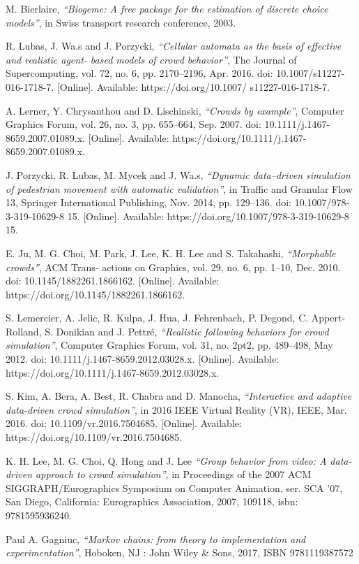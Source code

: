 \documentclass{standalone}
\begin{document}
\begin{thebibliography}{99}
M. Bierlaire,
  \textit{“Biogeme: A free package for the estimation of discrete choice models”}, 
in Swiss transport research conference, 
2003.

R. Lubas, J. Wa.s and J. Porzycki,
  \textit{“Cellular automata as the basis of effective and realistic agent- based models of crowd behavior”}, 
The Journal of Supercomputing, vol. 72, no. 6, pp. 2170–2196, 
Apr. 2016. 
doi: 10.1007/s11227-016-1718-7. 
[Online]. Available: https://doi.org/10.1007/ s11227-016-1718-7.

A. Lerner, Y. Chrysanthou and D. Lischinski, 
  \textit{“Crowds by example”}, 
  Computer Graphics Forum, vol. 26, no. 3, pp. 655–664, 
  Sep. 2007. 
  doi: 10.1111/j.1467-8659.2007.01089.x. 
  [Online]. Available: https://doi.org/10.1111/j.1467-8659.2007.01089.x.

J. Porzycki, R. Lubas, M. Mycek and J. Wa.s, 
  \textit{“Dynamic data–driven simulation of pedestrian movement with automatic validation”}, 
  in Traffic and Granular Flow 13, Springer International Publishing, 
  Nov. 2014, pp. 129–136. 
  doi: 10.1007/978-3-319-10629-8 15. 
  [Online]. Available: https://doi.org/10.1007/978-3-319-10629-8 15.

E. Ju, M. G. Choi, M. Park, J. Lee, K. H. Lee and S. Takahashi,
  \textit{“Morphable crowds”}, 
ACM Trans- actions on Graphics, vol. 29, no. 6, pp. 1–10, 
Dec. 2010. 
doi: 10.1145/1882261.1866162. 
[Online]. Available: https://doi.org/10.1145/1882261.1866162.

S. Lemercier, A. Jelic, R. Kulpa, J. Hua, J. Fehrenbach, P. Degond, C. Appert-Rolland, S. Donikian and J. Pettré,
  \textit{“Realistic following behaviors for crowd simulation”}, 
  Computer Graphics Forum, vol. 31, no. 2pt2, pp. 489–498, 
  May 2012. 
  doi: 10.1111/j.1467-8659.2012.03028.x. 
  [Online]. Available: https://doi.org/10.1111/j.1467-8659.2012.03028.x.

S. Kim, A. Bera, A. Best, R. Chabra and D. Manocha,
  \textit{“Interactive and adaptive data-driven crowd simulation”}, 
  in 2016 IEEE Virtual Reality (VR), IEEE, 
  Mar. 2016. 
  doi: 10.1109/vr.2016.7504685. 
  [Online]. Available: https://doi.org/10.1109/vr.2016.7504685.
 
K. H. Lee, M. G. Choi, Q. Hong and J. Lee
  \textit{“Group behavior from video: A data-driven approach to crowd simulation”}, 
in Proceedings of the 2007 ACM SIGGRAPH/Eurographics Symposium on Computer Animation, 
ser. SCA ’07, San Diego, California: Eurographics Association, 2007, 109118, 
isbn: 9781595936240.

Paul A. Gagniuc,
  \textit{“Markov chains: from theory to implementation and experimentation”}, 
Hoboken, NJ : John Wiley \& Sons, 
2017,
ISBN 9781119387572







\end{thebibliography}


\printbibliography
\end{document}
